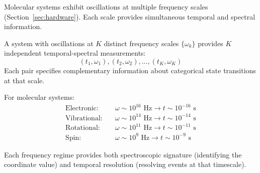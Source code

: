 Molecular systems exhibit oscillations at multiple frequency scales (Section~\ref{sec:hardware}). Each scale provides simultaneous temporal and spectral information.

\begin{theorem}
\label{thm:multiscale}
A system with oscillations at $K$ distinct frequency scales $\{\omega_k\}$ provides $K$ independent temporal-spectral measurements:
\begin{equation}
(t_1, \omega_1), (t_2, \omega_2), \ldots, (t_K, \omega_K)
\end{equation}
Each pair specifies complementary information about categorical state transitions at that scale.
\end{theorem}

For molecular systems:
\begin{align}
\text{Electronic:} \quad & \omega \sim 10^{16} \text{ Hz} \to t \sim 10^{-16} \text{ s} \\
\text{Vibrational:} \quad & \omega \sim 10^{14} \text{ Hz} \to t \sim 10^{-14} \text{ s} \\
\text{Rotational:} \quad & \omega \sim 10^{11} \text{ Hz} \to t \sim 10^{-11} \text{ s} \\
\text{Spin:} \quad & \omega \sim 10^{9} \text{ Hz} \to t \sim 10^{-9} \text{ s}
\end{align}

Each frequency regime provides both spectroscopic signature (identifying the coordinate value) and temporal resolution (resolving events at that timescale).

